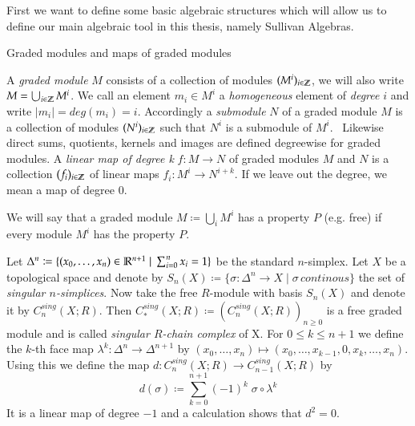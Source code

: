 First we want to define some basic algebraic structures which will allow us to define our main algebraic tool
in this thesis, namely Sullivan Algebras.

\begin{Definition}{Graded modules and maps of graded modules}

A \emph{graded module} $M$ consists of a collection of modules $(M^i)_{i \in \mathbb{Z}}$, we will also write
$M = \bigcup_{i \in \mathbb{Z}} M^i$. We call an element 
$m_i \in M^i$ a \emph{homogeneous} element of \emph{degree} $i$ and write $|m_i| = deg (m_i) = i$. Accordingly a \emph{submodule} $N$ of
a graded module $M$ is a collection of modules $(N^i)_{i \in \mathbb{Z}}$ such that $N^i$ is a submodule of $M^i$. \
Likewise direct sums, quotients, kernels and images are defined degreewise for graded modules. \newline
A \emph{linear map of degree k} $f \colon M \to N$ of graded modules $M$ and $N$ is a collection $(f_i)_{i \in \mathbb{Z}}$ of
linear maps $f_i \colon M^i \to N^{i + k}$. If we leave out the degree, we mean a map of degree $0$.
\end{Definition}

We will say that a graded module $M \coloneqq \bigcup_i M^i$ has a property $P$ (e.g. free) if every module $M^i$ has the property $P$.
 
\begin{Example}
\label{ex:SingularChainComplex}
 Let $\Delta^n \coloneqq {\lbrace (x_0, \dotsc , x_n) \in \mathbb{R}^{n+1} \; | \; \sum_{i = 0}^n x_i = 1\rbrace}$ be the standard
 $n$-simplex. Let $X$ be a topological space and denote by
 $S_n(X) \coloneqq {\lbrace \sigma \colon \Delta^n \to X \; | \; \sigma \, continous \rbrace}$ the set of
 \emph{singular $n$-simplices}. Now take the free $R$-module with basis $S_n(X)$ and denote it by $C_n^{sing}(X;R)$.
 Then $ C_*^{sing}(X;R) \coloneqq (C_n^{sing}(X;R))_{n \geq 0}$ is a free graded module and is called 
 \emph{singular $R$-chain complex} of X. \newline
 For $0 \leq k \leq n+1$ we define the $k$-th face map $\lambda^k \colon \Delta^{n} \to \Delta^{n+1}$ by
 $(x_0, \dotsc, x_n) \mapsto (x_0, \dotsc, x_{k-1},0, x_k, \dotsc, x_n)$.
 Using this we define the map $d \colon C_n^{sing}(X;R) \to C_{n-1}^{sing}(X;R)$ by
 $$ d(\sigma) \coloneqq \sum_{k = 0}^{n+1} (-1)^k \; \sigma \circ \lambda^k$$
 It is a linear map of degree $-1$ and a calculation shows that $d^2 = 0$.
 \end{Example}

